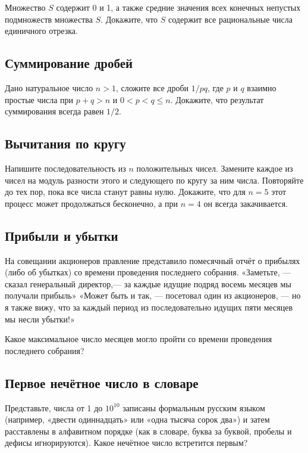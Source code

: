 Множество $S$ содержит 0 и 1, а также средние значения всех конечных непустых подмножеств множества $S$.
Докажите, что $S$ содержит все рациональные числа единичного отрезка.

\subsection*{Суммирование дробей}%

Дано натуральное число $n>1$, 
сложите все дроби $1/pq$, где $p$ и $q$ взаимно простые числа при $p+q>n$ и $0<p<q\le n$.
Докажите, что результат суммирования всегда равен $1/2$.

\subsection*{Вычитания по кругу}

Напишите последовательность из $n$ положительных чисел.
Замените каждое из чисел на модуль разности %
этого и следующего по кругу за ним числа.
Повторяйте до тех пор, пока все числа станут равны нулю.
Докажите, что для $n=5$ этот процесс может продолжаться бесконечно, 
а при $n=4$ он всегда закачивается.

\subsection*{Прибыли и убытки}%

На совещании акционеров правление представило помесячный отчёт о прибылях (либо об убытках) со времени проведения последнего собрания.
«Заметьте, --- сказал генеральный директор,--- за каждые идущие подряд восемь месяцев мы получали прибыль»
«Может быть и так, --- посетовал один из акционеров, --- но я также вижу, что за каждый период из последовательно идущих пяти месяцев мы несли убытки!»

Какое максимальное число месяцев могло пройти со времени проведения последнего собрания?

\subsection*{Первое нечётное число в словаре}%

Представьте, числа от 1 до $10^{10}$ записаны формальным русским языком (например, «двести одиннадцать» или «одна тысяча сорок два») и затем расставлены в алфавитном порядке (как в словаре, буква за буквой, пробелы и дефисы игнорируются).
Какое нечётное число встретится первым?
